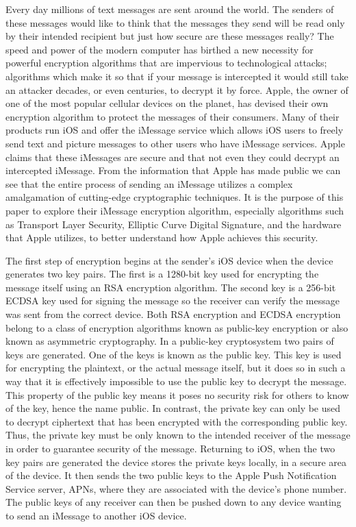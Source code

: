 Every day millions of text messages are sent around the world.  The senders of these messages would like to think that the messages they send will be read only by their intended recipient but just how secure are these messages really?  The speed and power of the modern computer has birthed a new necessity for powerful encryption algorithms that are impervious to technological attacks; algorithms which make it so that if your message is intercepted it would still take an attacker decades, or even centuries, to decrypt it by force.  Apple, the owner of one of the most popular cellular devices on the planet, has devised their own encryption algorithm to protect the messages of their consumers.  Many of their products run iOS and offer the iMessage service which allows iOS users to freely send text and picture messages to other users who have iMessage services.  Apple claims that these iMessages are secure and that not even they could decrypt an intercepted iMessage.  From the information that Apple has made public we can see that the entire process of sending an iMessage utilizes a complex amalgamation of cutting-edge cryptographic techniques.  It is the purpose of this paper to explore their iMessage encryption algorithm, especially algorithms such as Transport Layer Security, Elliptic Curve Digital Signature, and the hardware that Apple utilizes, to better understand how Apple achieves this security.

The first step of encryption begins at the sender's iOS device when the device generates two key pairs.  The first is a 1280-bit key used for encrypting the message itself using an RSA encryption algorithm.  The second key is a 256-bit ECDSA key used for signing the message so the receiver can verify the message was sent from the correct device.  Both RSA encryption and ECDSA encryption belong to a class of encryption algorithms known as public-key encryption or also known as asymmetric cryptography. In a public-key cryptosystem two pairs of keys are generated.  One of the keys is known as the public key.  This key is used for encrypting the plaintext, or the actual message itself, but it does so in such a way that it is effectively impossible to use the public key to decrypt the message.  This property of the public key means it poses no security risk for others to know of the key, hence the name public.  In contrast, the private key can only be used to decrypt ciphertext that has been encrypted with the corresponding public key.  Thus, the private key must be only known to the intended receiver of the message in order to guarantee security of the message.  Returning to iOS, when the two key pairs are generated the device stores the private keys locally, in a secure area of the device.  It then sends the two public keys to the Apple Push Notification Service server, APNs, where they are associated with the device's phone number.  The public keys of any receiver can then be pushed down to any device wanting to send an iMessage to another iOS device.

